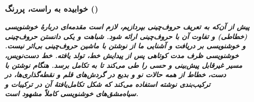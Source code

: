 \documentclass[10pt,a5paper]{article}
\theoremstyle{definition}
\theoremstyle{plain}
\begin{document}
\subsubsection{خوابیده به راست، پررنگ ()}
{\bfseries\itshape
پیش از آن‌که به تعریف حروف‌چینی بپردازیم، لازم است مقدمه‌ای دربارۀ خوشنویسی (خطاطی) و تفاوت آن با حروف‌چینی ارائه شود. شباهت و یکی دانستن حروف‌چینی و خوشنویسی بر دریافت و آشنایی ما از نوشتن با ماشین حروف‌چینی بی‌اثر نیست. خوشنویسی ظرف مدت کوتاهی پس از پیدایش خط، تولد یافته. خط دست‌نویس، مسیر غیرقابل پیش‌بینی و حسی را طی می‌کند تا به تکامل برسد. هنگام نوشتن با دست، خطاط از همه حالات نو و بدیع در گردش‌های قلم و نقطه‌گذاری‌ها، در ترکیب‌بندی نوشته استفاده می‌کند که شکل تکامل‌یافتۀ آن در ترکیبات و سیاه‌مشق‌های خوشنویسی کاملاً مشهود است.
}
\end{document}
